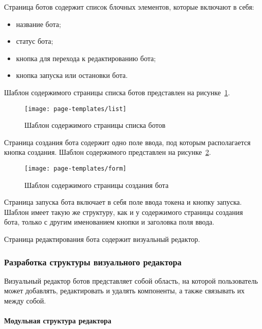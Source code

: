 Страница ботов содержит список блочных элементов, которые
включают в себя:
\begin{itemize}
	\item название бота;
	\item статус бота;
	\item кнопка для перехода к редактированию бота;
	\item кнопка запуска или остановки бота.
\end{itemize}

Шаблон содержимого страницы списка ботов представлен на
рисунке~\ref{f:list-template}.

\begin{figure}[ht]
	\centering
	\vspace{0.5cm}
	\texttt{[image: page-templates/list]}
	\caption{Шаблон содержимого страницы списка ботов}
	\label{f:list-template}
\end{figure}

Страница создания бота содержит одно поле ввода, под которым
располагается кнопка создания. Шаблон содержимого представлен на
рисунке~\ref{f:form-template}.


\begin{figure}[ht]
	\centering
	\vspace{0.5cm}
	\texttt{[image: page-templates/form]}
	\caption{Шаблон содержимого страницы создания бота}
	\label{f:form-template}
	\vspace{0.5cm}
\end{figure}

Страница запуска бота включает в себя поле ввода токена и кнопку
запуска. Шаблон имеет такую же структуру, как и у содержимого страницы создания бота,
только с другим именованием кнопки и заголовка поля ввода.

Страница редактирования бота содержит визуальный редактор.

\subsubsection{Разработка структуры визуального редактора}

Визуальный редактор ботов представляет собой область, на которой
пользователь может добавлять, редактировать и удалять компоненты, а также
связывать их между собой.

\paragraph{Модульная структура редактора}


